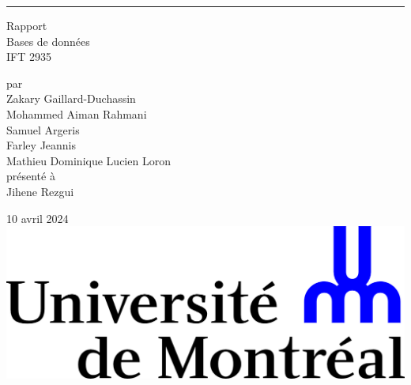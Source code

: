 \documentclass{article}
\begin{document}
\begin{titlepage}
  \centering
  
  \rule{\textwidth}{0px}
  \vspace{15mm}
  
  \Huge{Rapport} \\
  \vspace{5mm}
  \Large Bases de données \\
  IFT 2935
  
  \vspace{40mm}
  \large par \\ \vspace{3mm}
  Zakary Gaillard-Duchassin\\ \vspace{3mm}
  Mohammed Aiman Rahmani \\ \vspace{3mm}
  Samuel Argeris \\ \vspace{3mm}
  Farley Jeannis \\ \vspace{3mm}
  Mathieu Dominique Lucien Loron \\ \vspace{3mm}
  \vspace{30mm}
  présenté à \\ \vspace{3mm}
  Jihene Rezgui
  
  \vfill
  10 avril 2024 \\ \vspace{3mm}
  \includegraphics[scale=0.55]{logo-udem.png}
\end{titlepage}
\newpage

\end{document}
